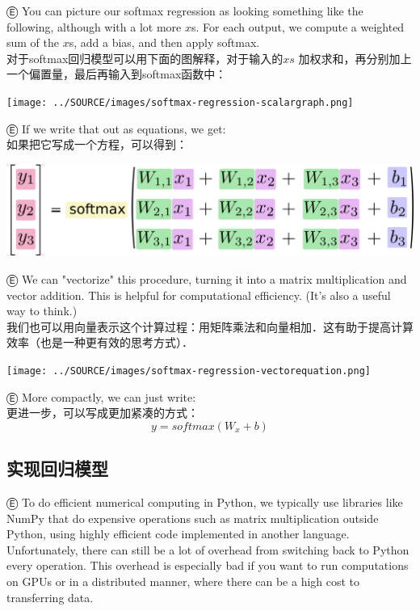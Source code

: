 Ⓔ You can picture our softmax regression as looking something like the following, although with a lot more $x$s. For each output, we compute a weighted sum of the $x$s, add a bias, and then apply softmax.\\
对于softmax回归模型可以用下面的图解释，对于输入的$xs$ 加权求和，再分别加上一个偏置量，最后再输入到softmax函数中：
\begin{center}
\texttt{[image: ../SOURCE/images/softmax-regression-scalargraph.png]}
\end{center}
Ⓔ If we write that out as equations, we get:\\
如果把它写成一个方程，可以得到：
\begin{center}
\includegraphics[width=.68\textwidth]{../SOURCE/images/softmax-regression-scalarequation.png}
\end{center}
Ⓔ We can "vectorize" this procedure, turning it into a matrix multiplication and vector addition. This is helpful for computational efficiency. (It's also a useful way to think.)\\
我们也可以用向量表示这个计算过程：用矩阵乘法和向量相加．这有助于提高计算效率（也是一种更有效的思考方式）．
\begin{center}
\texttt{[image: ../SOURCE/images/softmax-regression-vectorequation.png]}
\end{center}
Ⓔ More compactly, we can just write:\\
更进一步，可以写成更加紧凑的方式：
\begin{equation}
y = softmax(W_x+b)
\end{equation}

\subsection {实现回归模型}
Ⓔ To do efficient numerical computing in Python, we typically use libraries like NumPy that do expensive operations such as matrix multiplication outside Python, using highly efficient code implemented in another language. Unfortunately, there can still be a lot of overhead from switching back to Python every operation. This overhead is especially bad if you want to run computations on GPUs or in a distributed manner, where there can be a high cost to transferring data.

